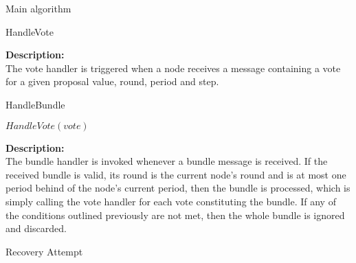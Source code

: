 \documentclass[10pt,a4paper]{article}
\begin{document}
\begin{section}{Main algorithm}
\begin{subsection}{HandleVote}
\begin{algorithm}[H]
\begin{algorithmic}[1]
        \EndFunction
        \end{algorithmic}
        \caption{\underline{HandleVote}}
    \end{algorithm}
    
    
    \noindent \textbf{Description:}\\
The vote handler is triggered when a node receives a message containing a vote for a given proposal value, round, period and step.

\end{subsection}


\begin{subsection}{HandleBundle}\label{ssect:HandleBundle}

    \begin{algorithm}[H]
        \begin{algorithmic}[1]

                    \State $HandleVote(vote)$
                \EndFor
            \EndIf

        \EndFunction
        \end{algorithmic}
        \caption{\underline{HandleBundle}}
    \end{algorithm}
    
    
    \noindent \textbf{Description:}\\
The bundle handler is invoked whenever a bundle message is received. 
If the received bundle is valid, its round is the current node's round
and is at most one period behind of the node's current period, then the bundle
is processed, which is simply calling the vote handler for each vote constituting
the bundle. If any of the conditions outlined previously are not met, then the
whole bundle is ignored and discarded.
    
\end{subsection}


\begin{subsection}{Recovery Attempt}\label{ssect:Recovery}

    \begin{algorithm}[H]
        \begin{algorithmic}[1]


\end{algorithmic}
\end{algorithm}
\end{subsection}
\end{section}
\end{document}
